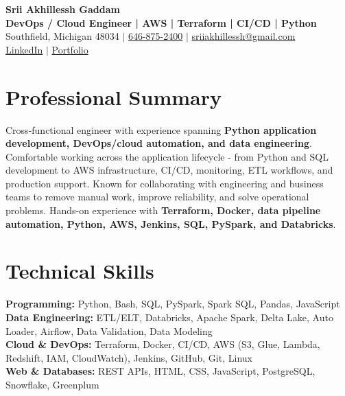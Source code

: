 \documentclass[letterpaper,10pt]{article}
\begin{document}
\fontsize{9.35pt}{10.45pt}\selectfont

\begin{center}
    {\LARGE \textbf{Srii Akhillessh Gaddam}} \\[-1pt]
    \textbf{DevOps / Cloud Engineer | AWS | Terraform | CI/CD | Python} \\[2pt]
    Southfield, Michigan 48034 $|$
    \href{tel:6468752400}{646-875-2400} $|$
    \href{mailto:sriiakhillessh@gmail.com}{sriiakhillessh@gmail.com} \\[1pt]
    \href{https://www.linkedin.com/in/srii-akhiilessh-gaddam-b48668191/}{LinkedIn} $|$
    \href{https://sriiakhillesshg.github.io/portfolio/}{Portfolio}
\end{center}
\vspace{-8pt}

\section{Professional Summary}
\small{Cross-functional engineer with experience spanning \textbf{Python application development, DevOps/cloud automation, and data engineering}. Comfortable working across the application lifecycle - from Python and SQL development to AWS infrastructure, CI/CD, monitoring, ETL workflows, and production support. Known for collaborating with engineering and business teams to remove manual work, improve reliability, and solve operational problems. Hands-on experience with \textbf{Terraform, Docker, data pipeline automation, Python, AWS, Jenkins, SQL, PySpark, and Databricks}.}

\section{Technical Skills}
\small{
\textbf{Programming:} Python, Bash, SQL, PySpark, Spark SQL, Pandas, JavaScript \\
\textbf{Data Engineering:} ETL/ELT, Databricks, Apache Spark, Delta Lake, Auto Loader, Airflow, Data Validation, Data Modeling \\
\textbf{Cloud \& DevOps:} Terraform, Docker, CI/CD, AWS (S3, Glue, Lambda, Redshift, IAM, CloudWatch), Jenkins, GitHub, Git, Linux \\
\textbf{Web \& Databases:} REST APIs, HTML, CSS, JavaScript, PostgreSQL, Snowflake, Greenplum
}
\end{document}
